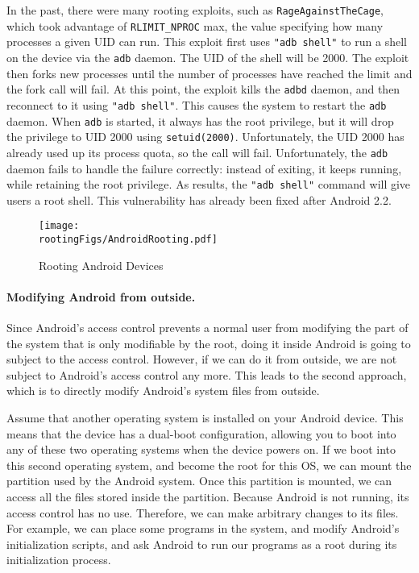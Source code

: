 In the past, there were many rooting exploits, such as
\texttt{RageAgainstTheCage}, which took advantage of 
\texttt{RLIMIT\_NPROC} max, the value specifying how many processes a given UID can run. 
This exploit first uses \texttt{"adb  shell"} to run a 
shell on the device via the \texttt{adb} daemon. The UID of the shell will
be 2000. The exploit then forks new processes until the number of processes
have reached the limit and the fork call will fail. 
At this point, the exploit kills the \texttt{adbd} daemon, and then
reconnect to it using \texttt{"adb shell"}. This causes the system to  
restart the \texttt{adb} daemon. When \texttt{adb} is started, it always
has the root privilege, but it will drop the privilege to UID 2000 using   
\texttt{setuid(2000)}. Unfortunately, the UID 2000 has already used up its 
process quota, so the call will fail. Unfortunately, the \texttt{adb}
daemon fails to handle the failure correctly: instead of exiting, it keeps
running, while retaining the root privilege. As results, the 
\texttt{"adb shell"} command will give users a root shell. 
This vulnerability has already been fixed after Android 2.2. 



\begin{figure}[htb]
	\begin{center}
		\texttt{[image: \\rootingFigs/AndroidRooting.pdf]}
	\end{center}
	\caption{Rooting Android Devices}
	\label{fig:rooting:androidrooting}
\end{figure}
 

\paragraph{Modifying Android from outside.}
Since Android's access control prevents a normal user from modifying the
part of the system that is only modifiable by the root, doing 
it inside Android is going to subject to the access control. However, if we can
do it from outside, we are not subject to Android's access control any
more. This leads to the second approach, which is to directly modify 
Android's system files from outside. 

 
Assume that another operating system is installed on your Android device. 
This means that the device has a dual-boot configuration, allowing you to boot into any
of these two operating systems when the device powers on. If we boot into
this second operating system, and become the root for this OS, 
we can mount the partition used by the
Android system. Once this partition is mounted, we can access all the files
stored inside the partition. Because Android is not running, its access
control has no use. Therefore, we can make arbitrary changes to its files.
For example, we can place some programs in the system, and modify Android's
initialization scripts, and ask Android to run our programs as a root
during its initialization process. 


